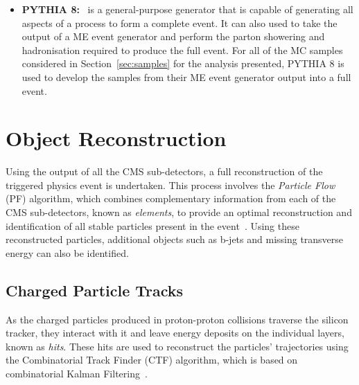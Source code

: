 \begin{itemize}
\item \textbf{PYTHIA 8:}~\cite{Sjostrand:2014zea} is a general-purpose generator that is capable of generating all aspects of a process to form a complete event.
It can also used to take the output of a ME event generator and perform the parton showering and hadronisation required to produce the full event. For all of the MC samples considered in Section~\ref{sec:samples} for the analysis presented, PYTHIA 8 is used to develop the samples from their ME event generator output into a full event.
\end{itemize}



\section{Object Reconstruction}\label{sec:reco}
Using the output of all the CMS sub-detectors, a full reconstruction of the triggered physics event is undertaken.
This process involves the \emph{Particle Flow} (PF) algorithm, which combines complementary information from each of the CMS sub-detectors, known as \emph{elements}, to provide an optimal reconstruction and identification of all stable particles present in the event~\cite{CMS:2009nxa,CMS:2010eua,CMS-PRF-14-001}.
Using these reconstructed particles, additional objects such as b-jets and missing transverse energy can also be identified.

\subsection{Charged Particle Tracks}\label{subsec:tracks}
As the charged particles produced in proton-proton collisions traverse the silicon tracker, they interact with it and leave energy deposits on the individual layers, known as \emph{hits}.
These hits are used to reconstruct the particles' trajectories using the Combinatorial Track Finder (CTF) algorithm, which is based on combinatorial Kalman Filtering~\cite{Chatrchyan:2014fea,Fruhwirth:1987fm}.

